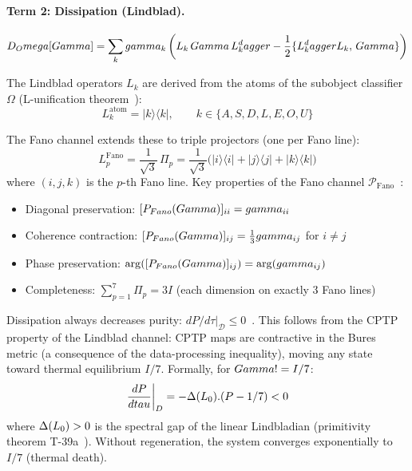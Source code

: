 \paragraph{Term 2: Dissipation (Lindblad).}
\begin{equation}
  D_Omega[Gamma] = \sum_k gamma_k
  \left( L_k\, Gamma\, L_k^dagger - \frac{1}{2}\{L_k^dagger L_k,\, Gamma\} \right)
  \label{eq:dissipation}
\end{equation}

The Lindblad operators $L_k$ are derived from the atoms of the subobject classifier
$\Omega$ (L-unification theorem~):
\begin{equation}
  L_k^{\mathrm{atom}} = |k\rangle\langle k|, \qquad k \in \{A,S,D,L,E,O,U\}
  \label{eq:lindblad-atoms}
\end{equation}

The Fano channel extends these to triple projectors (one per Fano line):
\begin{equation}
  L_p^{\mathrm{Fano}} = \frac{1}{\sqrt{3}}\,\Pi_p
  = \frac{1}{\sqrt{3}}\bigl(|i\rangle\langle i| + |j\rangle\langle j| + |k\rangle\langle k|\bigr)
  \label{eq:fano-operators}
\end{equation}
where $(i,j,k)$ is the $p$-th Fano line. Key properties of the Fano channel
$\mathcal{P}_{\mathrm{Fano}}$~:
\begin{itemize}[leftmargin=2em]
  \item Diagonal preservation: $[P_{Fano}(Gamma)]_{ii} = gamma_{ii}$
  \item Coherence contraction: $[P_{Fano}(Gamma)]_{ij} = \frac{1}{3}gamma_{ij}$
        for $i \neq j$
  \item Phase preservation: $\arg([P_{Fano}(Gamma)]_{ij}) = \arg(gamma_{ij})$
  \item Completeness: $\sum_{p=1}^{7} \Pi_p = 3I$ (each dimension on exactly 3 Fano lines)
\end{itemize}

Dissipation always decreases purity: $dP/d\tau|_{\mathcal{D}} \leq 0$~. This
follows from the CPTP property of the Lindblad channel: CPTP maps are contractive in the
Bures metric (a consequence of the data-processing inequality), moving any state toward
thermal equilibrium $I/7$. Formally, for $Gamma != I/7$:
\begin{equation}
  \frac{dP}{dtau}\bigg|_{D} = -\Delta(L_0) . (P - 1/7) < 0
  \label{eq:dissipation-decreases-purity}
\end{equation}
where $\Delta(L_0) > 0$ is the spectral gap of the linear Lindbladian (primitivity
theorem T-39a~). Without regeneration, the system converges exponentially to
$I/7$ (thermal death).

